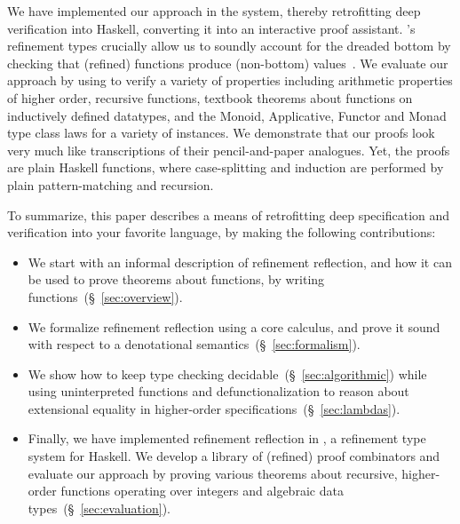 %
We have implemented our approach in the \toolname
system, thereby retrofitting deep verification into
Haskell, converting it into an interactive proof
assistant.
%
\toolname's refinement types crucially allow us to
soundly account for the dreaded bottom by checking
that (refined) functions produce (non-bottom)
values~\cite{Vazou14}.
%
We evaluate our approach by using \toolname to
verify a variety of properties including arithmetic
properties of higher order, recursive functions,
textbook theorems about functions on inductively
defined datatypes, and the Monoid, Applicative,
Functor and Monad type class laws for a variety
of instances. %
%
We demonstrate that our proofs look very much like
transcriptions of their pencil-and-paper analogues.
Yet, the proofs are plain Haskell functions, where
case-splitting and induction are performed by
plain pattern-matching and recursion.


To summarize, this paper describes a means of
retrofitting deep specification and verification
into your favorite language, by making the
following contributions:
%
\begin{itemize}
\item We start with an informal description of
      refinement reflection, and how it can
      be used to prove theorems about functions,
      by writing functions~(\S~\ref{sec:overview}).

\item We formalize refinement reflection using
      a core calculus, and prove it sound with
      respect to a denotational
      semantics~(\S~\ref{sec:formalism}).

\item We show how to keep type checking
      decidable~(\S~\ref{sec:algorithmic})
      while using uninterpreted functions and
      defunctionalization to reason about
      extensional equality in higher-order
      specifications~(\S~\ref{sec:lambdas}).

\item Finally, we have implemented refinement reflection
      in \toolname, a refinement type system for Haskell.
      We develop a library of (refined) proof combinators
      and evaluate our approach by proving various theorems
      about recursive, higher-order functions operating over
      integers and algebraic data types~(\S~\ref{sec:evaluation}).
\end{itemize}
